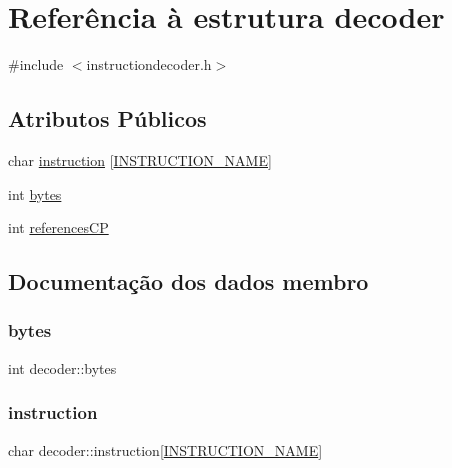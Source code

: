 \hypertarget{struct_mapper}{}\section{Referência à estrutura decoder}
\label{struct_mapper}


{\ttfamily \#include $<$instruction\+decoder.\+h$>$}

\subsection*{Atributos Públicos}
\begin{DoxyCompactItemize}
\item 
char \hyperlink{struct_mapper_accd08fb22057870b05be442ff0a4f580}{instruction} \mbox{[}\hyperlink{instruction_mapper_8h_ab77522c65df7d18cddc66f4f74a47f29}{I\+N\+S\+T\+R\+U\+C\+T\+I\+O\+N\+\_\+\+N\+A\+ME}\mbox{]}
\item 
int \hyperlink{struct_mapper_a03ccd2444e65aa0b113fb0f97b73f6f6}{bytes}
\item 
int \hyperlink{struct_mapper_af2d2cc85289235cb8ba33cb807404241}{references\+CP}
\end{DoxyCompactItemize}


\subsection{Documentação dos dados membro}
\hypertarget{struct_mapper_a03ccd2444e65aa0b113fb0f97b73f6f6}{}\label{struct_mapper_a03ccd2444e65aa0b113fb0f97b73f6f6} 
\subsubsection{\texorpdfstring{bytes}{bytes}}
{\footnotesize\ttfamily int decoder\+::bytes}

\hypertarget{struct_mapper_accd08fb22057870b05be442ff0a4f580}{}\label{struct_mapper_accd08fb22057870b05be442ff0a4f580} 
\subsubsection{\texorpdfstring{instruction}{instruction}}
{\footnotesize\ttfamily char decoder\+::instruction\mbox{[}\hyperlink{instruction_mapper_8h_ab77522c65df7d18cddc66f4f74a47f29}{I\+N\+S\+T\+R\+U\+C\+T\+I\+O\+N\+\_\+\+N\+A\+ME}\mbox{]}}

